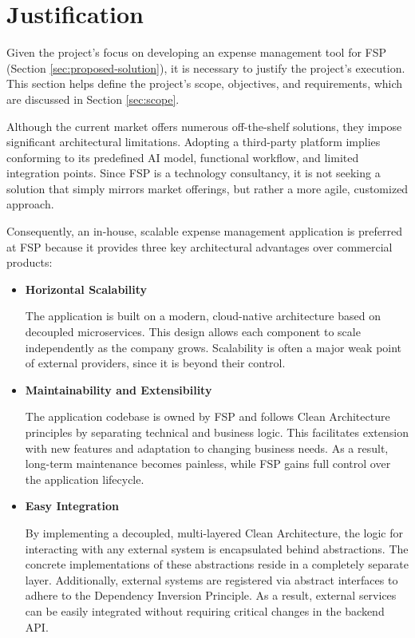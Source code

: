 \section{Justification}

Given the project's focus on developing an expense management tool for FSP (Section \ref{sec:proposed-solution}), it is necessary to justify the project's execution. This section helps define the project's scope, objectives, and requirements, which are discussed in Section \ref{sec:scope}. 

Although the current market offers numerous off-the-shelf solutions, they impose significant architectural limitations. Adopting a third-party platform implies conforming to its predefined AI model, functional workflow, and limited integration points. Since FSP is a technology consultancy, it is not seeking a solution that simply mirrors market offerings, but rather a more agile, customized approach.

Consequently, an in-house, scalable expense management application is preferred at FSP because it provides three key architectural advantages over commercial products:

\begin{itemize} [leftmargin=0.75cm, label=\textbullet]
    

    \item \textbf{Horizontal Scalability}

    The application is built on a modern, cloud-native architecture based on decoupled microservices. This design allows each component to scale independently as the company grows. Scalability is often a major weak point of external providers, since it is beyond their control.

    \item \textbf{Maintainability and Extensibility}

    The application codebase is owned by FSP and follows Clean Architecture principles by separating technical and business logic. This facilitates extension with new features and adaptation to changing business needs. As a result, long-term maintenance becomes painless, while FSP gains full control over the application lifecycle.

    \item \textbf{Easy Integration}

    By implementing a decoupled, multi-layered Clean Architecture, the logic for interacting with any external system is encapsulated behind abstractions. The concrete implementations of these abstractions reside in a completely separate layer. Additionally, external systems are registered via abstract interfaces to adhere to the Dependency Inversion Principle. As a result, external services can be easily integrated without requiring critical changes in the backend API.

\end{itemize}


